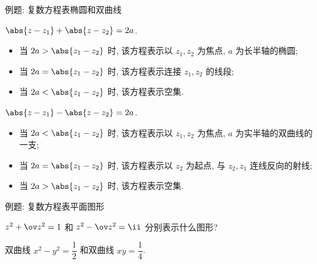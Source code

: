 \begin{frame}{例题: 复数方程表椭圆和双曲线}
	\onslide<+->
	\begin{example}
		$\abs{z-z_1}+\abs{z-z_2}=2a$.
		\begin{itemize}
			\item 当 $2a>\abs{z_1-z_2}$ 时, 该方程表示以 $z_1,z_2$ 为焦点, $a$ 为长半轴的椭圆;
			\item 当 $2a=\abs{z_1-z_2}$ 时, 该方程表示连接 $z_1,z_2$ 的线段;
			\item 当 $2a<\abs{z_1-z_2}$ 时, 该方程表示空集.
		\end{itemize}
	\end{example}
	\onslide<+->
	\begin{example}
		$\abs{z-z_1}-\abs{z-z_2}=2a$.
		\begin{itemize}
			\item 当 $2a<\abs{z_1-z_2}$ 时, 该方程表示以 $z_1,z_2$ 为焦点, $a$ 为实半轴的双曲线的一支;
			\item 当 $2a=\abs{z_1-z_2}$ 时, 该方程表示以 $z_2$ 为起点, 与 $z_2,z_1$ 连线反向的射线;
			\item 当 $2a>\abs{z_1-z_2}$ 时, 该方程表示空集.	
		\end{itemize}
	\end{example}
\end{frame}


\begin{frame}{例题: 复数方程表平面图形}
	\onslide<+->
	\begin{exercise}[nearnext]
		$z^2+\ov z^2=1$ 和 $z^2-\ov z^2=\ii$ 分别表示什么图形?
	\end{exercise}

	\onslide<+->
	\begin{answer}[nearprev]
		双曲线 $x^2-y^2=\dfrac12$ 和双曲线 $xy=\dfrac14$.
	\end{answer}
\end{frame}


